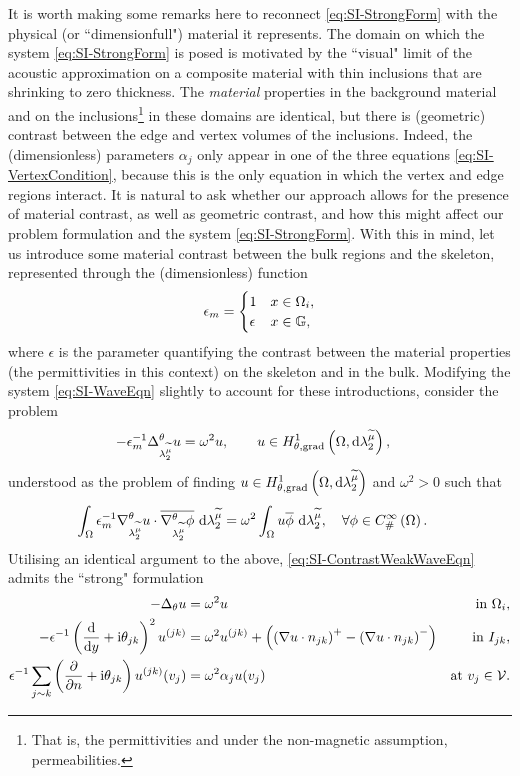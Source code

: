 It is worth making some remarks here to reconnect \eqref{eq:SI-StrongForm} with the physical (or ``dimensionfull") material it represents.
The domain on which the system \eqref{eq:SI-StrongForm} is posed is motivated by the ``visual" limit of the acoustic approximation on a composite material with thin inclusions that are shrinking to zero thickness.
The \emph{material} properties in the background material and on the inclusions\footnote{That is, the permittivities and under the non-magnetic assumption, permeabilities.} in these domains are identical, but there is (geometric) contrast between the edge and vertex volumes of the inclusions.
Indeed, the (dimensionless) parameters $\alpha_j$ only appear in one of the three equations \eqref{eq:SI-VertexCondition}, because this is the only equation in which the vertex and edge regions interact.
It is natural to ask whether our approach allows for the presence of material contrast, as well as geometric contrast, and how this might affect our problem formulation and the system \eqref{eq:SI-StrongForm}.
With this in mind, let us introduce some material contrast between the bulk regions and the skeleton, represented through the (dimensionless) function
\begin{align*}
	\epsilon_m =
	\begin{cases} 1 & x\in\Omega_i, \\ \epsilon & x\in\mathbb{G}, \end{cases}
\end{align*}
where $\epsilon$ is the parameter quantifying the contrast between the material properties (the permittivities in this context) on the skeleton and in the bulk.
Modifying the system \eqref{eq:SI-WaveEqn} slightly to account for these introductions, consider the problem
\begin{align*}
	-\epsilon_m^{-1}\Delta_{\lambda_2^{\widetilde{\mu}}}^{\theta} u &= \omega^2 u,
	\qquad u\in H^1_{\theta, \mathrm{grad}}\left( \Omega, \mathrm{d}\lambda_2^{\widetilde{\mu}} \right),
\end{align*}
understood as the problem of finding $u\in H^1_{\theta, \mathrm{grad}}\left( \Omega, \mathrm{d}\lambda_2^{\widetilde{\mu}} \right)$ and $\omega^2>0$ such that
\begin{align} \label{eq:SI-ContrastWeakWaveEqn}
	\int_{\Omega} \epsilon_m^{-1}\nabla^{\theta}_{\lambda_2^{\widetilde{\mu}}}u\cdot\overline{\nabla^{\theta}_{\lambda_2^{\widetilde{\mu}}}\phi}  \ \mathrm{d}\lambda_2^{\widetilde{\mu}}
	&= \omega^2 \int_{\Omega} u\overline{\phi}  \ \mathrm{d}\lambda_2^{\widetilde{\mu}}, \quad\forall\phi\in C^{\infty}_{\#}\left( \Omega \right).
\end{align}
Utilising an identical argument to the above, \eqref{eq:SI-ContrastWeakWaveEqn} admits the ``strong" formulation
\begin{subequations}
	\begin{align*}
		-\Delta_\theta u 
		&= \omega^2 u 
		&\text{in } \Omega_i, \\
		- \epsilon^{-1}\left( \dfrac{\mathrm{d}}{\mathrm{d}y} + \mathrm{i}\theta_{jk} \right)^2u^{(jk)}  
		&= \omega^2 u^{(jk)} + \left( \left( \nabla u\cdot n_{jk} \right)^+ - \left( \nabla u\cdot n_{jk} \right)^- \right)
		&\text{in } I_{jk}, \\
		\epsilon^{-1}\sum_{j\sim k} \left( \dfrac{\partial }{\partial n}+\mathrm{i}\theta_{jk} \right) u^{(jk)}(v_j) 
		&= \omega^2 \alpha_j u(v_j)
		&\text{at } v_j\in\mathcal{V}.
	\end{align*}
\end{subequations}
